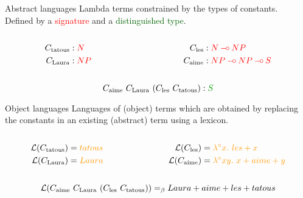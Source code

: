 \documentclass{beamer}
\def\limp {\mathbin{{-}\mkern-3.5mu{\circ}}}
\begin{document}
\begin{frame}
  \begin{block}{Abstract languages}
    Lambda terms constrained by the types of constants. \\ Defined by a
    \textcolor{red}{signature} and a \textcolor{darkgreen}{distinguished
      type}.

    \begin{columns}[t]
      \begin{column}{0.5\textwidth}
        \begin{align*}
          C_{\textrm{tatous}} &: \textcolor{red}{N} \\
          C_{\textrm{Laura}} &: \textcolor{red}{NP}
        \end{align*}
      \end{column}
      \begin{column}{0.5\textwidth}
        \begin{align*}
          \synt{les} &: \textcolor{red}{N \limp NP} \\
          \synt{aime} &: \textcolor{red}{NP \limp NP \limp S}
        \end{align*}
      \end{column}
    \end{columns}

    $$\synt{aime}\ \synt{Laura}\ (\synt{les}\ \synt{tatous}) :
    \textcolor{darkgreen}{S}$$
  \end{block}

  \begin{block}{Object languages}
    Languages of (object) terms which are obtained by replacing the
    constants in an existing (abstract) term using a \textcolor{darkgold}{lexicon}.

    \begin{columns}[t]
      \begin{column}{0.5\textwidth}
        \begin{align*}
          \mathcal{L}(\synt{tatous}) &= \textcolor{darkgold}{tatous} \\
          \mathcal{L}(\synt{Laura}) &= \textcolor{darkgold}{Laura}
        \end{align*}
      \end{column}
      \begin{column}{0.5\textwidth}
        \begin{align*}
          \mathcal{L}(\synt{les}) &= \textcolor{darkgold}{\lambda^{\circ} x.\ les + x} \\
          \mathcal{L}(\synt{aime}) &= \textcolor{darkgold}{\lambda^{\circ} x y.\ x + aime + y}
        \end{align*}
      \end{column}
    \end{columns}

    $$\mathcal{L}(\synt{aime}\ \synt{Laura}\ (\synt{les}\ \synt{tatous}))
    =_{\beta} Laura + aime + les + tatous$$
  \end{block}
\end{frame}
\end{document}
